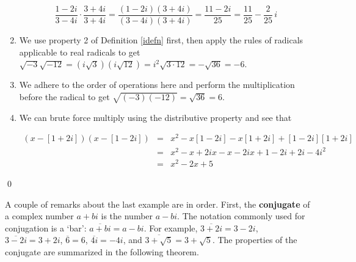\begin{ex}
\begin{enumerate}
\[ \dfrac{1-2i}{3-4i} \cdot \dfrac{3+4i}{3+4i} = \dfrac{(1-2i)(3+4i)}{(3-4i)(3+4i)} = \dfrac{11-2i}{25} = \dfrac{11}{25} - \dfrac{2}{25} \, i\]

\item  We use property 2 of Definition \ref{idefn} first, then apply the rules of radicals applicable to real radicals to get $\sqrt{-3} \sqrt{-12} = \left(i \sqrt{3}\right) \left(i \sqrt{12}\right) = i^2 \sqrt{3\cdot 12} = -\sqrt{36} = -6$.

\item  We adhere to the order of operations here and perform the multiplication before the radical to get  $\sqrt{(-3)(-12)} = \sqrt{36} = 6$. 

\item  We can brute force multiply using the distributive property and see that 

\[\begin{array}{rclr} (x-[1+2i])(x-[1-2i]) & = &  x^2 -x[1-2i]-x[1+2i]+[1-2i][1+2i] & \\

																					 &	= & x^2-x+2ix-x-2ix+1-2i+2i-4i^2 & \\ 
																					 & =  & x^2 -2x +5 & \end{array}\]

\end{enumerate}

\vspace{-.25in} \qed

\end{ex}

A couple of remarks about the last example are in order.  First, the   \textbf{conjugate} of a complex number $a+bi$ is the number $a-bi$.  The notation commonly used for conjugation is a `bar':  $\overline{a+bi} = a-bi$. For example, $\overline{3+2i} = 3-2i$, $\overline{3-2i} = 3+2i$, $\overline{6} = 6$, $\overline{4i} = -4i$, and $\overline{3+\sqrt{5}} = 3+\sqrt{5}$.  The properties of the conjugate are summarized in the following theorem.

